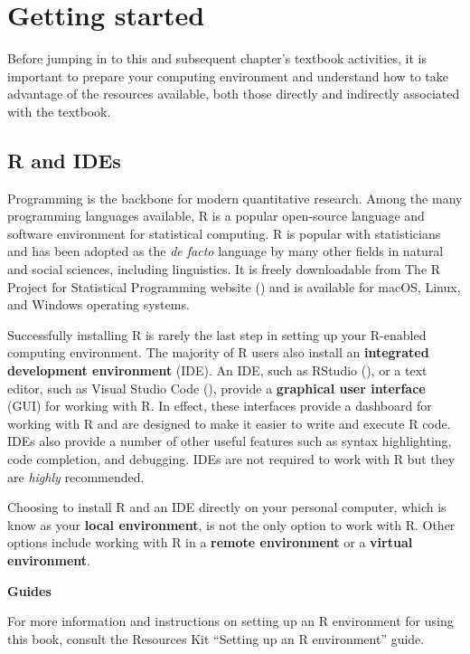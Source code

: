 \documentclass[
  letterpaper,
  krantz1]{latex/krantz-mod}
\theoremstyle{definition}
\theoremstyle{definition}
\theoremstyle{remark}
\begin{document}
\section*{Getting started}\label{sec-preface-getting-started}


Before jumping in to this and subsequent chapter's textbook activities,
it is important to prepare your computing environment and understand how
to take advantage of the resources available, both those directly and
indirectly associated with the textbook.

\subsection*{R and IDEs}\label{sec-preface-r-ides}

Programming is the backbone for modern quantitative research. Among the
many programming languages available, R is a popular open-source
language and software environment for statistical computing. R is
popular with statisticians and has been adopted as the \emph{de facto}
language by many other fields in natural and social sciences, including
linguistics. It is freely downloadable from The R Project for
Statistical Programming website () and is available for macOS, Linux, and Windows
operating systems.

Successfully installing R is rarely the last step in setting up your
R-enabled computing environment. The majority of R users also install an
\textbf{integrated development environment} (IDE). An IDE, such as
RStudio (), or a text editor, such
as Visual Studio Code (),
provide a \textbf{graphical user interface} (GUI) for working with R. In
effect, these interfaces provide a dashboard for working with R and are
designed to make it easier to write and execute R code. IDEs also
provide a number of other useful features such as syntax highlighting,
code completion, and debugging. IDEs are not required to work with R but
they are \emph{highly} recommended.

Choosing to install R and an IDE directly on your personal computer,
which is know as your \textbf{local environment}, is not the only option
to work with R. Other options include working with R in a \textbf{remote
environment} or a \textbf{virtual environment}.

\begin{tcolorbox}[enhanced jigsaw, leftrule=.75mm, colframe=quarto-callout-color-frame, left=2mm, colback=white, toprule=.15mm, breakable, arc=.35mm, opacityback=0, bottomrule=.15mm, rightrule=.15mm]

\textbf{ Guides}

For more information and instructions on setting up an R environment for
using this book, consult the Resources Kit ``Setting up an R
environment'' guide.

\end{tcolorbox}
\end{document}
